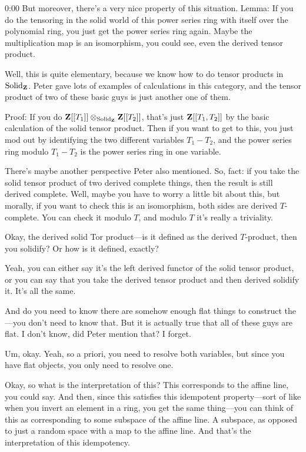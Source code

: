 \begin{unfinished}{0:00}
But moreover, there's a very nice property of this situation. Lemma: If you do the tensoring in the solid world of this power series ring with itself over the polynomial ring, you just get the power series ring again. Maybe the multiplication map is an isomorphism, you could see, even the derived tensor product.

Well, this is quite elementary, because we know how to do tensor products in $\mathrm{Solid}_\mathbf Z$. Peter gave lots of examples of calculations in this category, and the tensor product of two of these basic guys is just another one of them. 

Proof: If you do $\mathbf Z[[T_1]] \otimes_{\mathrm{Solid}_\mathbf Z} \mathbf Z[[T_2]]$, that's just $\mathbf Z[[T_1, T_2]]$ by the basic calculation of the solid tensor product. Then if you want to get to this, you just mod out by identifying the two different variables $T_1 - T_2$, and the power series ring modulo $T_1 - T_2$ is the power series ring in one variable.

There's maybe another perspective Peter also mentioned.
So, fact: if you take the solid tensor product of two derived complete things, then the result is still derived complete. Well, maybe you have to worry a little bit about this, but morally, if you want to check this is an isomorphism, both sides are derived $T$-complete. You can check it modulo $T$, and modulo $T$ it's really a triviality.

Okay, the derived solid Tor product---is it defined as the derived $T$-product, then you solidify? Or how is it defined, exactly?

Yeah, you can either say it's the left derived functor of the solid tensor product, or you can say that you take the derived tensor product and then derived solidify it. It's all the same.

And do you need to know there are somehow enough flat things to construct the---you don't need to know that. But it is actually true that all of these guys are flat. I don't know, did Peter mention that? I forget.

Um, okay. Yeah, so a priori, you need to resolve both variables, but since you have flat objects, you only need to resolve one.

Okay, so what is the interpretation of this? This corresponds to the affine line, you could say. And then, since this satisfies this idempotent property---sort of like when you invert an element in a ring, you get the same thing---you can think of this as corresponding to some subspace of the affine line. A subspace, as opposed to just a random space with a map to the affine line. And that's the interpretation of this idempotency.


\end{unfinished}
